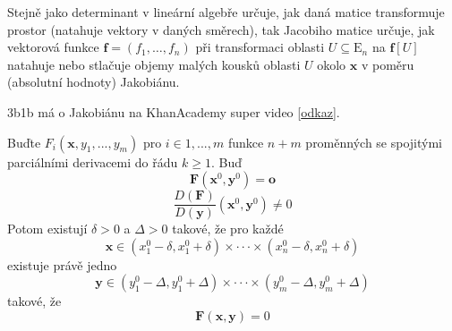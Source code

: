 \documentclass[../main.tex]{subfiles}
\begin{document}
\begin{intuition}
	Stejně jako determinant v lineární algebře určuje, jak daná matice transformuje prostor (natahuje vektory v daných směrech), tak Jacobiho matice určuje, jak vektorová funkce $\mathbf{f} = \left(f_1, \ldots, f_n\right)$ při transformaci oblasti $U \subseteq \mathrm{E}_n$ na $\mathbf{f}[U]$ natahuje nebo stlačuje objemy malých kousků oblasti $U$ okolo $\mathbf{x}$ v poměru (absolutní hodnoty) Jakobiánu.
\end{intuition}

\begin{remark}
	3b1b má o Jakobiánu na KhanAcademy super video [\href{https://www.khanacademy.org/math/multivariable-calculus/multivariable-derivatives/jacobian/v/the-jacobian-matrix}{odkaz}].
\end{remark}

\begin{theorem}
	Buďte $F_i(\mathbf{x}, y_1, ... , y_m)$ pro $i \in {1, ... , m}$ funkce $n+m$ proměnných se spojitými
	parciálními derivacemi do řádu $k \geq 1$. Buď \[ \mathbf{F}(\mathbf{x}^0, \mathbf{y}^0) = \mathbf{o} \]
	\[ \frac{D(\mathbf{F})}{D(\mathbf{y})}(\mathbf{x}^0, \mathbf{y}^0) \neq 0 \]
	Potom existují $\delta > 0$ a $\Delta > 0$ takové, že pro každé
	\[ \mathbf{x} \in (x_{1}^{0} - \delta, x_{1}^{0} + \delta) \times \cdot \cdot \cdot \times 
	(x_{n}^{0} - \delta, x_{n}^{0} + \delta)\]
	existuje právě jedno
	\[ \mathbf{y} \in (y_{1}^{0} - \Delta , y_{1}^{0} + \Delta) \times \cdot \cdot \cdot \times
	(y_{m}^{0} - \Delta , y_{m}^{0} + \Delta) \]
	takové, že
	\[ \mathbf{F}(\mathbf{x}, \mathbf{y}) = 0 \]
\end{theorem}
\end{document}
